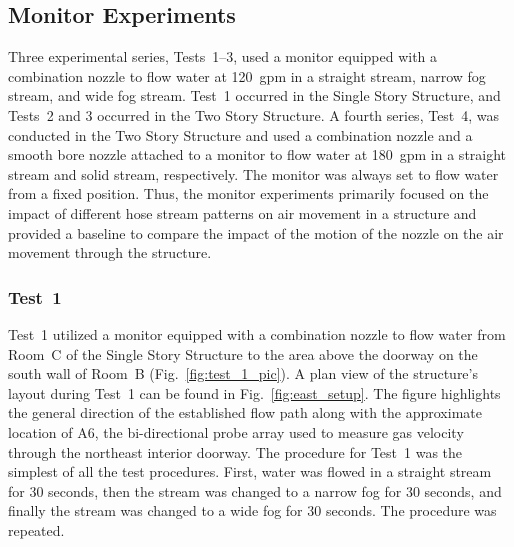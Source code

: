 \documentclass[12pt,oneside]{book}
\begin{document}
\subsection{Monitor Experiments}
\label{sec:monitor_procedure}
Three experimental series, Tests~1--3, used a monitor equipped with a combination nozzle to flow water at 120~gpm in a straight stream, narrow fog stream, and wide fog stream. Test~1 occurred in the Single Story Structure, and Tests~2 and 3 occurred in the Two Story Structure. A fourth series, Test~4, was conducted in the Two Story Structure and used a combination nozzle and a smooth bore nozzle attached to a monitor to flow water at 180~gpm in a straight stream and solid stream, respectively. The monitor was always set to flow water from a fixed position. Thus, the monitor experiments primarily focused on the impact of different hose stream patterns on air movement in a structure and provided a baseline to compare the impact of the motion of the nozzle on the air movement through the structure.

\subsubsection{Test~1}
Test~1 utilized a monitor equipped with a combination nozzle to flow water from Room~C of the Single Story Structure to the area above the doorway on the south wall of Room~B (Fig.~\ref{fig:test_1_pic}). A plan view of the structure's layout during Test~1 can be found in Fig.~\ref{fig:east_setup}. The figure highlights the general direction of the established flow path along with the approximate location of A6, the bi-directional probe array used to measure gas velocity through the northeast interior doorway. The procedure for Test~1 was the simplest of all the test procedures. First, water was flowed in a straight stream for 30 seconds, then the stream was changed to a narrow fog for 30 seconds, and finally the stream was changed to a wide fog for 30 seconds. The procedure was repeated.
\end{document}
